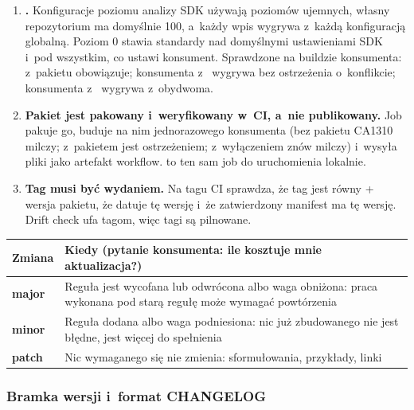 \begin{enumerate}
  \item \textbf{.} Konfiguracje poziomu analizy SDK używają
        poziomów ujemnych, własny  repozytorium ma domyślnie 100,
        a~każdy wpis  wygrywa z~każdą konfiguracją globalną. Poziom 0
        stawia standardy nad domyślnymi ustawieniami SDK i~pod wszystkim, co ustawi konsument.
        Sprawdzone na buildzie konsumenta:  z~pakietu obowiązuje;
         konsumenta z~ wygrywa bez ostrzeżenia
        o~konflikcie;  konsumenta z~ wygrywa
        z~obydwoma.
  \item \textbf{Pakiet jest pakowany i~weryfikowany w~CI, a~nie publikowany.} Job
         pakuje go, buduje na nim jednorazowego konsumenta (bez pakietu CA1310
        milczy; z~pakietem jest ostrzeżeniem; z~wyłączeniem znów milczy) i~wysyła pliki
         jako artefakt workflow.  to ten sam
        job do uruchomienia lokalnie.
  \item \textbf{Tag musi być wydaniem.} Na tagu  CI sprawdza, że tag jest równy
         + wersja pakietu, że  datuje tę wersję i~że
        zatwierdzony manifest ma tę wersję. Drift check ufa tagom, więc tagi są pilnowane.
\end{enumerate}

\begin{tabularx}{\linewidth}{@{}>{\raggedright\arraybackslash}p{1.6cm} >{\raggedright\arraybackslash}X@{}}
\toprule
Zmiana & Kiedy (pytanie konsumenta: ile kosztuje mnie aktualizacja?) \\
\midrule
\textbf{major} & Reguła jest wycofana lub odwrócona albo waga obniżona: praca wykonana pod starą regułę może wymagać powtórzenia \\
\textbf{minor} & Reguła dodana albo waga podniesiona: nic już zbudowanego nie jest błędne, jest więcej do spełnienia \\
\textbf{patch} & Nic wymaganego się nie zmienia: sformułowania, przykłady, linki \\
\bottomrule
\end{tabularx}

\subsubsection{Bramka wersji i~format CHANGELOG}

